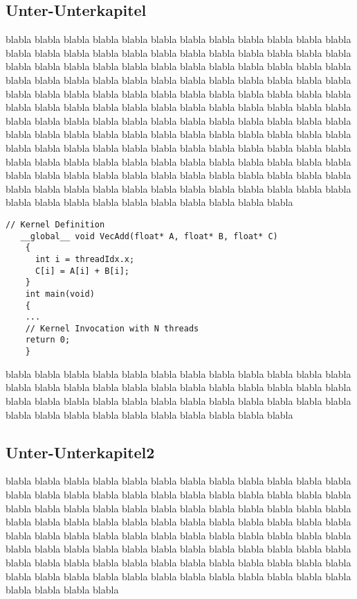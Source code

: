 \documentclass[12pt,a4paper,DIV13,pdftex,BCOR10mm,fleqn,liststotoc,bibtotoc,cleardoubleempty]{scrbook}
\begin{document}
\subsection{Unter-Unterkapitel}
blabla blabla blabla blabla blabla blabla blabla blabla blabla blabla blabla blabla blabla blabla blabla blabla blabla blabla blabla blabla blabla blabla blabla blabla blabla blabla blabla blabla blabla blabla blabla blabla blabla blabla blabla blabla blabla blabla blabla blabla blabla blabla blabla blabla blabla blabla blabla blabla blabla blabla blabla blabla blabla blabla blabla blabla blabla blabla blabla blabla blabla blabla blabla blabla blabla blabla blabla blabla blabla blabla blabla blabla blabla blabla blabla blabla blabla blabla blabla blabla blabla blabla blabla blabla blabla blabla blabla blabla blabla blabla blabla blabla blabla blabla blabla blabla blabla blabla blabla blabla
blabla blabla blabla blabla blabla blabla blabla blabla blabla blabla blabla blabla blabla blabla blabla blabla blabla blabla blabla blabla blabla blabla blabla blabla blabla blabla blabla blabla blabla blabla blabla blabla blabla blabla blabla blabla blabla blabla blabla blabla blabla blabla blabla blabla blabla blabla blabla blabla blabla blabla blabla blabla blabla blabla
\begin{lstlisting}[caption={Beispiel f\"{u}r eine Activity}, label={list:activity}]
    // Kernel Definition
   __global__ void VecAdd(float* A, float* B, float* C)
    {
      int i = threadIdx.x;
      C[i] = A[i] + B[i];
    }
    int main(void)
    {
    ...
    // Kernel Invocation with N threads
    return 0;
    }
    \end{lstlisting}
blabla blabla blabla blabla blabla blabla blabla blabla blabla blabla blabla blabla blabla blabla blabla blabla blabla blabla blabla blabla blabla blabla blabla blabla blabla blabla blabla blabla blabla blabla blabla blabla blabla blabla blabla blabla blabla blabla blabla blabla blabla blabla blabla blabla blabla blabla
\subsection{Unter-Unterkapitel2}
blabla blabla blabla blabla blabla blabla blabla blabla blabla blabla blabla blabla blabla blabla blabla blabla blabla blabla blabla blabla blabla blabla blabla blabla blabla blabla blabla blabla blabla blabla blabla blabla blabla blabla blabla blabla blabla blabla blabla blabla blabla blabla blabla blabla blabla blabla blabla blabla blabla blabla blabla blabla blabla blabla blabla blabla blabla blabla blabla blabla blabla blabla blabla blabla blabla blabla blabla blabla blabla blabla blabla blabla blabla blabla blabla blabla blabla blabla blabla blabla blabla blabla blabla blabla blabla blabla blabla blabla blabla blabla blabla blabla blabla blabla blabla blabla blabla blabla blabla blabla
\end{document}
